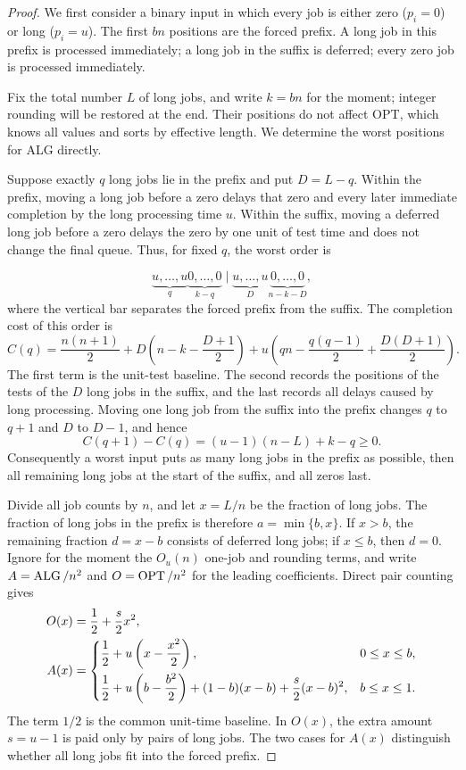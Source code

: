 \begin{proof}
We first consider a binary input in which every job is either zero
($p_i=0$) or long ($p_i=u$).  The first $bn$ positions are the forced
prefix.  A long job in this prefix is processed immediately; a long job in
the suffix is deferred; every zero job is processed immediately.

Fix the total number $L$ of long jobs, and write $k=bn$ for the moment;
integer rounding will be restored at the end.  Their positions do not affect
OPT, which knows all values and sorts by effective length.  We determine the
worst positions for ALG directly.

Suppose exactly $q$ long jobs lie in the prefix and put $D=L-q$.  Within the
prefix, moving a long job before a zero delays that zero and every later
immediate completion by the long processing time $u$.  Within the suffix,
moving a deferred long job before a zero delays the zero by one unit of test
time and does not change the final queue.  Thus, for fixed $q$, the worst
order is

\[
 \underbrace{u,\ldots,u}_{q}
 \underbrace{0,\ldots,0}_{k-q}
 \mathbin{|}
 \underbrace{u,\ldots,u}_{D}
 \underbrace{0,\ldots,0}_{n-k-D},
\]
where the vertical bar separates the forced prefix from the suffix.  The
completion cost of this order is
\begin{equation}
 C(q)=\frac{n(n+1)}2
 +D\left(n-k-\frac{D+1}{2}\right)
 +u\left(qn-\frac{q(q-1)}2+\frac{D(D+1)}2\right).
 \label{eq:opt:binary-order-cost}
\end{equation}
The first term is the unit-test baseline.  The second records the positions
of the tests of the $D$ long jobs in the suffix, and the last records all
delays caused by long processing.  Moving one long job from the suffix into
the prefix changes
$q$ to $q+1$ and $D$ to $D-1$, and hence
\[
 C(q+1)-C(q)=(u-1)(n-L)+k-q\ge0.
\]
Consequently a worst input puts as many long jobs in the prefix as possible,
then all remaining long jobs at the start of the suffix, and all zeros last.

Divide all job counts by $n$, and let $x=L/n$ be the fraction of long jobs.
The fraction of long jobs in the prefix is therefore $a=\min\{b,x\}$.  If
$x>b$, the remaining fraction $d=x-b$ consists of deferred long jobs; if
$x\le b$, then
$d=0$.  Ignore for the moment the $O_u(n)$ one-job and rounding terms, and
write $A=\operatorname{ALG}/n^2$ and $O=\operatorname{OPT}/n^2$ for the leading coefficients.  Direct
pair counting gives
\begin{align}
 O(x)&=\frac12+\frac{s}{2}x^2,
 \notag\\
 A(x)&=
 \begin{cases}
 \displaystyle
  \frac12+u\left(x-\frac{x^2}{2}\right),
     &0\le x\le b,\\[3mm]
 \displaystyle
  \frac12+u\left(b-\frac{b^2}{2}\right)
  +(1-b)(x-b)+\frac{s}{2}(x-b)^2,
     &b\le x\le1.
 \end{cases}
 \label{eq:opt:binary-upper-gap}
\end{align}
The term $1/2$ is the common unit-time baseline.  In $O(x)$, the extra
amount $s=u-1$ is paid only by pairs of long jobs.  The two cases for $A(x)$
distinguish whether all long jobs fit into the forced prefix.


\end{proof}
